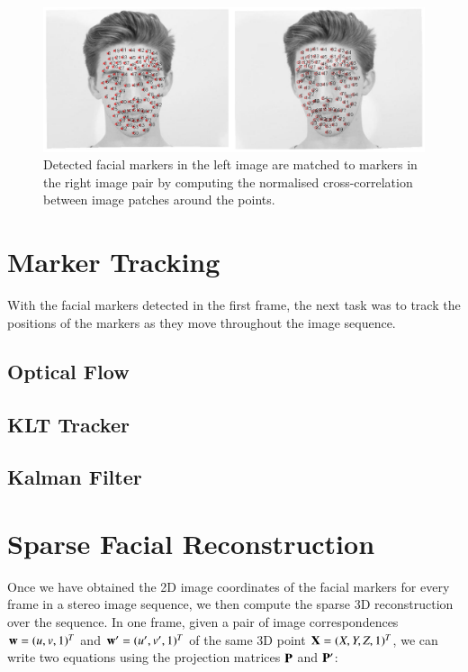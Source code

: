 \begin{figure}[htbp!]
\centering
\includegraphics[width=\textwidth]{img/matching}
	\caption{Detected facial markers in the left image are matched to markers in the right image pair by computing the normalised cross-correlation between image patches around the points.}
	\label{fig:matching}
\end{figure}

\section{Marker Tracking}

With the facial markers detected in the first frame, the next task was to track the positions of the markers as they move throughout the image sequence. 

\subsection{Optical Flow}

\subsection{KLT Tracker}

\cite{Shi:1994}

\subsection{Kalman Filter}

\section{Sparse Facial Reconstruction}

Once we have obtained the 2D image coordinates of the facial markers for every frame in a stereo image sequence, we then compute the sparse 3D reconstruction over the sequence. In one frame, given a pair of image correspondences $\mathbf{w} = (u,v,1)^T$ and $\mathbf{w}' = (u',v',1)^T$ of the same 3D point $\mathbf{X} = (X,Y,Z,1)^T$, we can write two equations using the projection matrices $\mathbf{P}$ and $\mathbf{P'}$:

